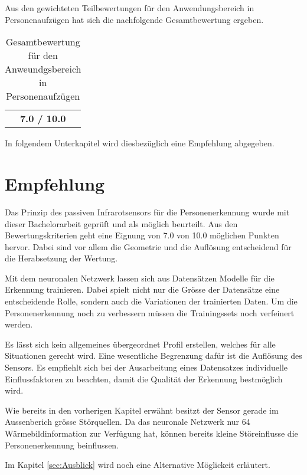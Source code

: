 Aus den gewichteten Teilbewertungen für den Anwendungsbereich in Personenaufzügen  hat sich die nachfolgende Gesamtbewertung ergeben.
\begin{table}[H]
	\centering
	\caption{Gesamtbewertung für den Anweundgsbereich in Personenaufzügen}
	\label{tab:Gesamtbewertung}
	\begin{tabular}{|c|}
		\hline
		\rowcolor[HTML]{9B9B9B} 
		\multicolumn{1}{|c|}{\cellcolor[HTML]{9B9B9B}\textbf{Gesamtbewertung}} \\ \hline
		\textbf{7.0 / 10.0 }                                                                   \\ \hline
	\end{tabular}
\end{table} 

In folgendem Unterkapitel wird diesbezüglich eine Empfehlung abgegeben.
\section{Empfehlung}
\label{sec:Empfehlung}

Das Prinzip des passiven Infrarotsensors für die Personenerkennung wurde mit dieser Bachelorarbeit geprüft und als möglich beurteilt. Aus den Bewertungskriterien geht eine Eignung von 7.0 von 10.0 möglichen Punkten hervor. Dabei sind vor allem die Geometrie und die Auflösung entscheidend für die Herabsetzung der Wertung. 

Mit dem neuronalen Netzwerk lassen sich aus Datensätzen Modelle für die Erkennung trainieren. Dabei spielt nicht nur die Grösse der Datensätze eine entscheidende Rolle, sondern auch die Variationen der trainierten Daten. Um die Personenerkennung noch zu verbessern müssen die Trainingssets noch verfeinert werden. 

Es lässt sich kein allgemeines übergeordnet Profil erstellen, welches für alle Situationen gerecht wird. Eine wesentliche Begrenzung dafür ist die Auflösung des Sensors. Es empfiehlt sich bei der Ausarbeitung eines Datensatzes individuelle Einflussfaktoren zu beachten, damit die Qualität der Erkennung bestmöglich wird. 

Wie bereits in den vorherigen Kapitel erwähnt besitzt der Sensor gerade im Aussenberich grösse Störquellen. Da das neuronale Netzwerk nur 64 Wärmebildinformation zur Verfügung hat, können bereits kleine Störeinflusse die Personenerkennung beinflussen.

Im Kapitel \ref{sec:Ausblick} wird noch eine Alternative Möglickeit erläutert. 

